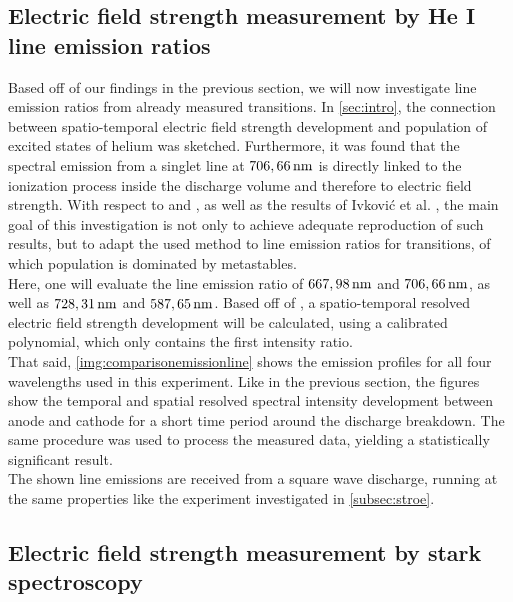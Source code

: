 \documentclass[a4paper,10pt,twoside]{article}
\begin{document}
			\begin{multicols}{2}
				
				\subsection{Electric field strength measurement by He I line emission ratios}
				
					Based off of our findings in the previous section, we will now investigate line emission ratios from already measured transitions. In \autoref{sec:intro}, the connection between spatio-temporal electric field strength development and population of excited states of helium was sketched. Furthermore, it was found that the spectral emission from a singlet line at $\unit[706,66]{nm}$ is directly linked to the ionization process inside the discharge volume and therefore to electric field strength. With respect to \cite{Massines} and \cite{0022-3727-36-1-306}, as well as the results of Ivkovi{\'c} et al. \cite{linratio1_14} \cite{linratio2_14}, the main goal of this investigation is not only to achieve adequate reproduction of such results, but to adapt the used method to line emission ratios for transitions, of which population is dominated by metastables.\\
					Here, one will evaluate the line emission ratio of $\unit[667,98]{nm}$ and $\unit[706,66]{nm}$, as well as $\unit[728,31]{nm}$ and $\unit[587,65]{nm}$. Based off of \cite{lineratio1_14}, a spatio-temporal resolved electric field strength development will be calculated, using a calibrated polynomial, which only contains the first intensity ratio.\\
					That said, \autoref{img:comparisonemissionline} shows the emission profiles for all four wavelengths used in this experiment. Like in the previous section, the figures show the temporal and spatial resolved spectral intensity development between anode and cathode for a short time period around the discharge breakdown. The same procedure was used to process the measured data, yielding a statistically significant result.\\
					The shown line emissions are received from a square wave discharge, running at the same properties like the experiment investigated in \autoref{subsec:stroe}.
				
			\end{multicols}
			
			\twocolumn
		
		\subsection{Electric field strength measurement by stark spectroscopy}
		
\end{document}
